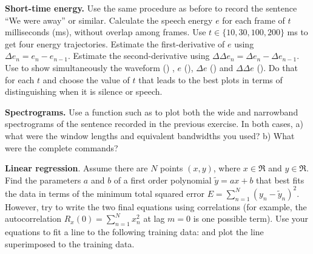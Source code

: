 \begin{exercises}
\item \textbf{Short-time energy.} Use the same procedure as before
to record the sentence ``We were away'' or similar.
Calculate the speech energy $e$ for each frame of $t$ milliseconds
(ms), without overlap among frames. Use $t \in \{10, 30, 100,
200\}$ ms to get four energy trajectories. Estimate the
first-derivative of $e$ using $\Delta e_n = e_n-e_{n-1}$. Estimate
the second-derivative using $\Delta \Delta e_n = \Delta e_n-
\Delta e_{n-1}$. Use  to show simultaneously the
waveform () , $e$ (), $\Delta e$
() and $\Delta\Delta e$ (). Do
that for each $t$ and choose the value of $t$ that leads to the
best plots in terms of distinguishing when it is silence or
speech.

\item \textbf{Spectrograms.} Use a function such as  to plot both the wide and
narrowband spectrograms of the sentence recorded in the previous
exercise. In both cases, a) what were the window lengths and
equivalent bandwidths you used? b) What were the complete
commands?

\item \textbf{Linear regression}. Assume there are $N$ points $(x,y)$, where $x \in \Re$ and
$y \in \Re$. Find the parameters $a$ and $b$ of a first order
polynomial $\tilde{y}=ax+b$ that best fits the data in terms of
the minimum total squared error $E=\sum_{n=1}^N
(y_n-\tilde{y}_n)^2$. 
However, try to write the two final equations using
correlations (for example, the autocorrelation
$R_x(0)=\sum_{n=1}^N x_n^2$ at lag $m=0$ is one possible term).
Use your equations to fit a line to the following training data:
 and
plot the line superimposed to the training data.


\end{exercises}
